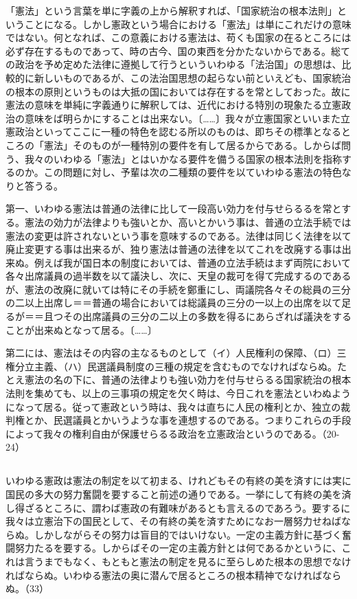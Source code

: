 「憲法」という言葉を単に字義の上から解釈すれば、「国家統治の根本法則」ということになる。しかし憲政という場合における「憲法」は単にこれだけの意味ではない。何となれば、この意義における憲法は、苟くも国家の在るところには必ず存在するものであって、時の古今、国の東西を分かたないからである。総ての政治を予め定めた法律に遵拠して行うといういわゆる「法治国」の思想は、比較的に新しいものであるが、この法治国思想の起らない前といえども、国家統治の根本の原則というものは大抵の国においては存在するを常としておった。故に憲法の意味を単純に字義通りに解釈しては、近代における特別の現象たる立憲政治の意味をば明らかにすることは出来ない。〔……〕我々が立憲国家といいまた立憲政治といってここに一種の特色を認むる所以のものは、即ちその標準となるところの「憲法」そのものが一種特別の要件を有して居るからである。しからば問う、我々のいわゆる「憲法」とはいかなる要件を備うる国家の根本法則を指称するのか。この問題に対し、予輩は次の二種類の要件を以ていわゆる憲法の特色なりと答うる。

第一、いわゆる憲法は普通の法律に比して一段高い効力を付与せらるるを常とする。憲法の効力が法律よりも強いとか、高いとかいう事は、普通の立法手続では憲法の変更は許されないという事を意味するのである。法律は同じく法律を以て廃止変更する事は出来るが、独り憲法は普通の法律を以てこれを改廃する事は出来ぬ。例えば我が国日本の制度においては、普通の立法手続はまず両院において各々出席議員の過半数を以て議決し、次に、天皇の裁可を得て完成するのであるが、憲法の改廃に就いては特にその手続を鄭重にし、両議院各々その総員の三分の二以上出席し＝＝普通の場合においては総議員の三分の一以上の出席を以て足るが＝＝且つその出席議員の三分の二以上の多数を得るにあらざれば議決をすることが出来ぬとなって居る。〔……〕

第二には、憲法はその内容の主なるものとして（イ）人民権利の保障、（ロ）三権分立主義、（ハ）民選議員制度の三種の規定を含むものでなければならぬ。たとえ憲法の名の下に、普通の法律よりも強い効力を付与せらるる国家統治の根本法則を集めても、以上の三事項の規定を欠く時は、今日これを憲法といわぬようになって居る。従って憲政という時は、我々は直ちに人民の権利とか、独立の裁判権とか、民選議員とかいうような事を連想するのである。つまりこれらの手段によって我々の権利自由が保護せらるる政治を立憲政治というのである。（20-24）


\subsection{}



いわゆる憲政は憲法の制定を以て初まる、けれどもその有終の美を済すには実に国民の多大の努力奮闘を要すること前述の通りである。一挙にして有終の美を済し得ざるところに、謂わば憲政の有難味があるとも言えるのであろう。要するに我々は立憲治下の国民として、その有終の美を済すためになお一層努力せねばならぬ。しかしながらその努力は盲目的ではいけない。一定の主義方針に基づく奮闘努力たるを要する。しからばその一定の主義方針とは何であるかというに、これは言うまでもなく、もともと憲法の制定を見るに至らしめた根本の思想でなければならぬ。いわゆる憲法の奥に潜んで居るところの根本精神でなければならぬ。（33）


